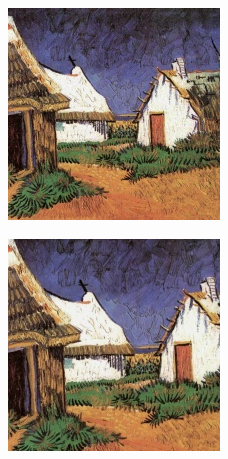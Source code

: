 \documentclass{article}
\begin{document}

\begin{figure}
    \begin{subfigure}[b]{0.3\linewidth}
        \includegraphics[width=\textwidth]{report/img/data_aug/19597.jpg}
    \end{subfigure}
    \hfill
    \begin{subfigure}[b]{0.3\linewidth}
        \includegraphics[width=\textwidth]{report/img/data_aug/19612.jpg}

\end{subfigure}
\end{figure}
\end{document}
